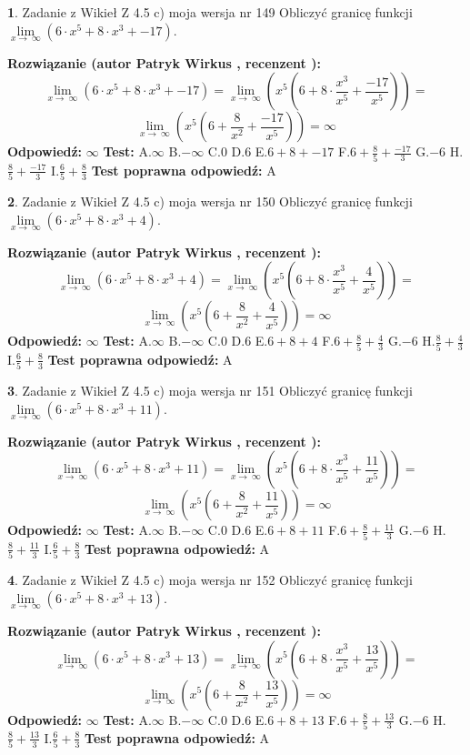\documentclass[12pt, a4paper]{article}
\theoremstyle{definition} %
\newtheorem{zad}{}
\newcommand{\zadStart}[1]{\begin{zad}#1\newline}
\newcommand{\zadStop}{\end{zad}}
\newcommand{\rozwStart}[2]{\noindent \textbf{Rozwiązanie (autor #1 , recenzent #2): }\newline}
\newcommand{\rozwStop}{\newline}
\newcommand{\odpStart}{\noindent \textbf{Odpowiedź:}\newline}
\newcommand{\odpStop}{\newline}
\newcommand{\testStart}{\noindent \textbf{Test:}\newline}
\newcommand{\testStop}{\newline}
\newcommand{\kluczStart}{\noindent \textbf{Test poprawna odpowiedź:}\newline}
\newcommand{\kluczStop}{\newline}
\begin{document}
\zadStart{Zadanie z Wikieł Z 4.5 c) moja wersja nr 149}
Obliczyć granicę funkcji  $\lim\limits_{x\to\ \infty}(6 \cdot x^{5}+8 \cdot x^{3}+-17)$.
\zadStop
\rozwStart{Patryk Wirkus}{}
$$\lim\limits_{x\to\ \infty}(6 \cdot x^{5}+8 \cdot x^{3}+-17) = \lim\limits_{x\to\ \infty}(x^{5}(6 +8 \cdot \frac{x^{3}}{x^{5}}+\frac{-17}{x^{5}})) =$$ $$\lim\limits_{x\to\ \infty}(x^{5}(6 +\frac{8}{x^{2}}+\frac{-17}{x^{5}})) =\infty$$
\rozwStop
\odpStart
$\infty$
\odpStop
\testStart
A.$\infty$ B.$-\infty$ C.$0$ D.$6$ E.$6 + 8 + -17$
F.$6+\frac{8}{5}+\frac{-17}{3}$ G.$-6$
H.$\frac{8}{5}+\frac{-17}{3}$
I.$\frac{6}{5}+\frac{8}{3}$
\testStop
\kluczStart
A
\kluczStop



\zadStart{Zadanie z Wikieł Z 4.5 c) moja wersja nr 150}
Obliczyć granicę funkcji  $\lim\limits_{x\to\ \infty}(6 \cdot x^{5}+8 \cdot x^{3}+4)$.
\zadStop
\rozwStart{Patryk Wirkus}{}
$$\lim\limits_{x\to\ \infty}(6 \cdot x^{5}+8 \cdot x^{3}+4) = \lim\limits_{x\to\ \infty}(x^{5}(6 +8 \cdot \frac{x^{3}}{x^{5}}+\frac{4}{x^{5}})) =$$ $$\lim\limits_{x\to\ \infty}(x^{5}(6 +\frac{8}{x^{2}}+\frac{4}{x^{5}})) =\infty$$
\rozwStop
\odpStart
$\infty$
\odpStop
\testStart
A.$\infty$ B.$-\infty$ C.$0$ D.$6$ E.$6 + 8 + 4$
F.$6+\frac{8}{5}+\frac{4}{3}$ G.$-6$
H.$\frac{8}{5}+\frac{4}{3}$
I.$\frac{6}{5}+\frac{8}{3}$
\testStop
\kluczStart
A
\kluczStop



\zadStart{Zadanie z Wikieł Z 4.5 c) moja wersja nr 151}
Obliczyć granicę funkcji  $\lim\limits_{x\to\ \infty}(6 \cdot x^{5}+8 \cdot x^{3}+11)$.
\zadStop
\rozwStart{Patryk Wirkus}{}
$$\lim\limits_{x\to\ \infty}(6 \cdot x^{5}+8 \cdot x^{3}+11) = \lim\limits_{x\to\ \infty}(x^{5}(6 +8 \cdot \frac{x^{3}}{x^{5}}+\frac{11}{x^{5}})) =$$ $$\lim\limits_{x\to\ \infty}(x^{5}(6 +\frac{8}{x^{2}}+\frac{11}{x^{5}})) =\infty$$
\rozwStop
\odpStart
$\infty$
\odpStop
\testStart
A.$\infty$ B.$-\infty$ C.$0$ D.$6$ E.$6 + 8 + 11$
F.$6+\frac{8}{5}+\frac{11}{3}$ G.$-6$
H.$\frac{8}{5}+\frac{11}{3}$
I.$\frac{6}{5}+\frac{8}{3}$
\testStop
\kluczStart
A
\kluczStop



\zadStart{Zadanie z Wikieł Z 4.5 c) moja wersja nr 152}
Obliczyć granicę funkcji  $\lim\limits_{x\to\ \infty}(6 \cdot x^{5}+8 \cdot x^{3}+13)$.
\zadStop
\rozwStart{Patryk Wirkus}{}
$$\lim\limits_{x\to\ \infty}(6 \cdot x^{5}+8 \cdot x^{3}+13) = \lim\limits_{x\to\ \infty}(x^{5}(6 +8 \cdot \frac{x^{3}}{x^{5}}+\frac{13}{x^{5}})) =$$ $$\lim\limits_{x\to\ \infty}(x^{5}(6 +\frac{8}{x^{2}}+\frac{13}{x^{5}})) =\infty$$
\rozwStop
\odpStart
$\infty$
\odpStop
\testStart
A.$\infty$ B.$-\infty$ C.$0$ D.$6$ E.$6 + 8 + 13$
F.$6+\frac{8}{5}+\frac{13}{3}$ G.$-6$
H.$\frac{8}{5}+\frac{13}{3}$
I.$\frac{6}{5}+\frac{8}{3}$
\testStop
\kluczStart
A
\kluczStop
\end{document}
